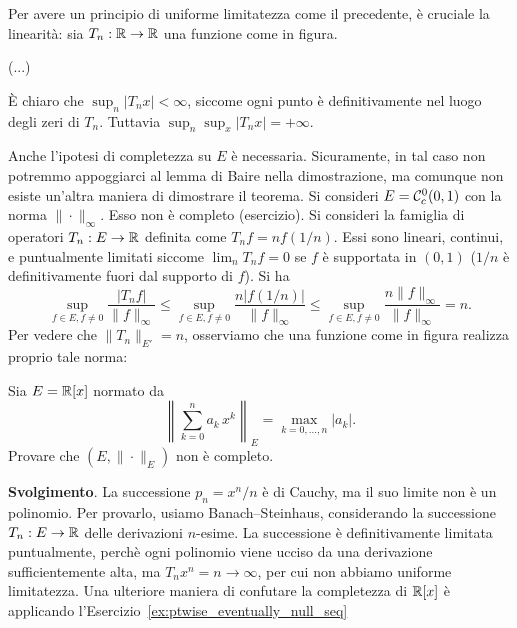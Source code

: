 \begin{counterexample}
	Per avere un principio di uniforme limitatezza come il precedente, è cruciale la linearità: sia $T_n:\mathbb{R} \to \mathbb{R}$ una funzione come in figura.

	(...)

	È chiaro che $\sup_n |T_n x| < \infty$, siccome ogni punto è definitivamente nel luogo degli zeri di $T_n$. Tuttavia $\sup_n \sup_x |T_n x| = + \infty$.
\end{counterexample}

\begin{counterexample}
	Anche l'ipotesi di completezza su $E$ è necessaria. Sicuramente, in tal caso non potremmo appoggiarci al lemma di Baire nella dimostrazione, ma comunque non esiste un'altra maniera di dimostrare il teorema.
	Si consideri $E = \mathcal{C}^0_c(0,1)$ con la norma $\|\cdot\|_\infty$. Esso non è completo (esercizio). Si consideri la famiglia di operatori $T_n : E \to \mathbb{R}$ definita come $T_nf = n f(1/n)$. Essi sono lineari, continui, e puntualmente limitati siccome $\lim_n T_n f = 0$ se $f$ è supportata in $(0,1)$ ($1/n$ è definitivamente fuori dal supporto di $f$). Si ha
	\begin{equation*}
		\sup_{f \in E, f \neq 0} \frac{|T_n f|}{\|f\|_\infty} \leq \sup_{f \in E, f \neq 0} \frac{n|f(1/n)|}{\|f\|_\infty} \leq \sup_{f \in E, f \neq 0} \frac{n\|f\|_\infty}{\|f\|_\infty} = n.
	\end{equation*}
	Per vedere che $\|T_n\|_{E'} = n$, osserviamo che una funzione come in figura realizza proprio tale norma:

	\begin{figure}[H]
		\centering
	\end{figure}
\end{counterexample}

\begin{exercise}
	Sia $E = \mathbb{R}[x]$ normato da
	\begin{equation*}
		\left\|\sum_{k=0}^n a_k\,x^k\right\|_E = \max_{k = 0, \ldots, n} |a_k|.
	\end{equation*}
	Provare che $(E, \|\cdot\|_E)$ non è completo.

	\textbf{Svolgimento}. La successione $p_n = x^n/n$ è di Cauchy, ma il suo limite non è un polinomio.
	Per provarlo, usiamo Banach--Steinhaus, considerando la successione $T_n : E \to \mathbb{R}$ delle derivazioni $n$-esime.
	La successione è definitivamente limitata puntualmente, perchè ogni polinomio viene ucciso da una derivazione sufficientemente alta, ma $T_n x^n = n \to \infty$, per cui non abbiamo uniforme limitatezza.
	Una ulteriore maniera di confutare la completezza di $\mathbb{R}[x]$ è applicando l'Esercizio~\ref{ex:ptwise_eventually_null_seq}
\end{exercise}

